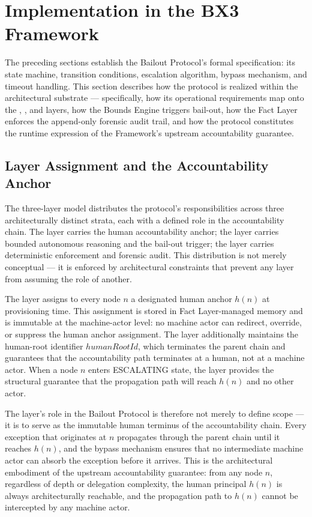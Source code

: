 \section{Implementation in the BX3 Framework}\label{sec:implementation}

The preceding sections establish the Bailout Protocol's formal specification: its state machine, transition conditions, escalation algorithm, bypass mechanism, and timeout handling. This section describes how the protocol is realized within the \bxthree{} architectural substrate — specifically, how its operational requirements map onto the \purpose{}, \bounds{}, and \fact{} layers, how the Bounds Engine triggers bail-out, how the Fact Layer enforces the append-only forensic audit trail, and how the protocol constitutes the runtime expression of the \bxthree{} Framework's upstream accountability guarantee.

\subsection{Layer Assignment and the Accountability Anchor}

The \bxthree{} three-layer model distributes the protocol's responsibilities across three architecturally distinct strata, each with a defined role in the accountability chain. The \purpose{} layer carries the human accountability anchor; the \bounds{} layer carries bounded autonomous reasoning and the bail-out trigger; the \fact{} layer carries deterministic enforcement and forensic audit. This distribution is not merely conceptual — it is enforced by architectural constraints that prevent any layer from assuming the role of another.

The \purpose{} layer assigns to every node $n$ a designated human anchor $h(n)$ at provisioning time. This assignment is stored in Fact Layer-managed memory and is immutable at the machine-actor level: no machine actor can redirect, override, or suppress the human anchor assignment. The \purpose{} layer additionally maintains the human-root identifier $humanRootId$, which terminates the parent chain and guarantees that the accountability path terminates at a human, not at a machine actor. When a node $n$ enters ESCALATING state, the \purpose{} layer provides the structural guarantee that the propagation path will reach $h(n)$ and no other actor.

The \purpose{} layer's role in the Bailout Protocol is therefore not merely to define scope — it is to serve as the immutable human terminus of the accountability chain. Every exception that originates at $n$ propagates through the parent chain until it reaches $h(n)$, and the bypass mechanism ensures that no intermediate machine actor can absorb the exception before it arrives. This is the architectural embodiment of the upstream accountability guarantee: from any node $n$, regardless of depth or delegation complexity, the human principal $h(n)$ is always architecturally reachable, and the propagation path to $h(n)$ cannot be intercepted by any machine actor.

